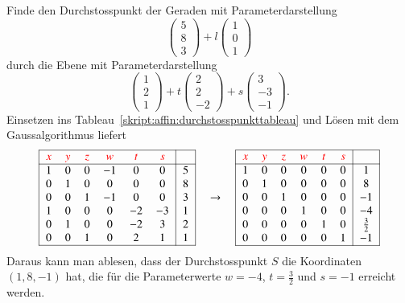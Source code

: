\begin{beispiel}
Finde den Durchstosspunkt der Geraden mit Parameterdarstellung
\[
\begin{pmatrix} 5\\8\\3 \end{pmatrix}
+
l\begin{pmatrix} 1\\0\\1 \end{pmatrix}
\]
durch die Ebene mit Parameterdarstellung
\[
\begin{pmatrix}1\\2\\1 \end{pmatrix}
+
t\begin{pmatrix}2\\2\\-2\end{pmatrix}
+
s\begin{pmatrix}3\\-3\\-1\end{pmatrix}.
\]
Einsetzen ins Tableau~\ref{skript:affin:durchstosspunkttableau}
und Lösen mit dem Gaussalgorithmus liefert
\[
\begin{tabular}{|>{$}c<{$}>{$}c<{$}>{$}c<{$}>{$}c<{$}>{$}c<{$}>{$}c<{$}|>{$}c<{$}|}
\hline
\color{red}x&\color{red}y&\color{red}z&\color{red}w&\color{red}t&\color{red}s&\\
\hline
1&0&0&-1& 0& 0&5\\
0&1&0& 0& 0& 0&8\\
0&0&1&-1& 0& 0&3\\
1&0&0& 0&-2&-3&1\\
0&1&0& 0&-2& 3&2\\
0&0&1& 0& 2& 1&1\\
\hline
\end{tabular}
\quad\rightarrow\quad
\begin{tabular}{|>{$}c<{$}>{$}c<{$}>{$}c<{$}>{$}c<{$}>{$}c<{$}>{$}c<{$}|>{$}c<{$}|}
\hline
\color{red}x&\color{red}y&\color{red}z&\color{red}w&\color{red}t&\color{red}s&\\
\hline
1&0&0& 0& 0& 0& 1\\
0&1&0& 0& 0& 0& 8\\
0&0&1& 0& 0& 0&-1\\
0&0&0& 1& 0& 0&-4\\
0&0&0& 0& 1& 0& \frac32\\
0&0&0& 0& 0& 1&-1\\
\hline
\end{tabular}
\]
Daraus kann man ablesen, dass der Durchstosspunkt $S$ die Koordinaten
$(1,8,-1)$ hat, die für die Parameterwerte $w=-4$, $t=\frac32$ und $s=-1$
erreicht werden.
\end{beispiel}

